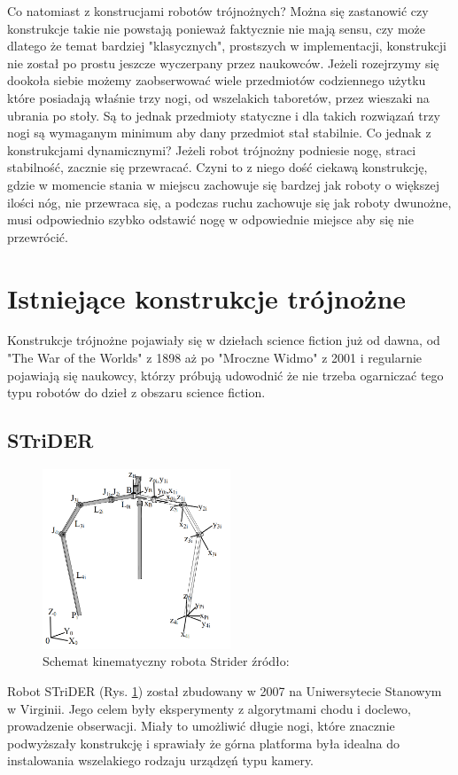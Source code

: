 Co natomiast z konstrucjami robotów trójnożnych? Można się zastanowić czy konstrukcje takie nie powstają ponieważ faktycznie nie mają sensu, czy może dlatego że temat bardziej "klasycznych", prostszych w implementacji, konstrukcji nie został po prostu jeszcze wyczerpany przez naukowców. Jeżeli rozejrzymy się dookoła siebie możemy zaobserwować wiele przedmiotów codziennego użytku które posiadają właśnie trzy nogi, od wszelakich taboretów, przez wieszaki na ubrania po stoły. Są to jednak przedmioty statyczne i dla takich rozwiązań trzy nogi są wymaganym minimum aby dany przedmiot stał stabilnie. Co jednak z konstrukcjami dynamicznymi? Jeżeli robot trójnożny podniesie nogę, straci stabilność, zacznie się przewracać. Czyni to z niego dość ciekawą konstrukcję, gdzie w momencie stania w miejscu zachowuje się bardzej jak roboty o większej ilości nóg, nie przewraca się, a podczas ruchu zachowuje się jak roboty dwunożne, musi odpowiednio szybko odstawić nogę w odpowiednie miejsce aby się nie przewrócić.\\

\section{Istniejące konstrukcje trójnożne}
Konstrukcje trójnożne pojawiały się w dziełach science fiction już od dawna, od "The War of the Worlds" z 1898 aż po "Mroczne Widmo" z 2001 i regularnie pojawiają się naukowcy, którzy próbują udowodnić że nie trzeba ogarniczać tego typu robotów do dzieł z obszaru science fiction.\\
\subsection{STriDER}
\label{cha:strider}
\begin{figure}[h!]
\centering
\includegraphics[width=0.5\textwidth]{img/strider_photo.png}
\caption{Schemat kinematyczny robota Strider źródło: \cite{strider}}
\label{img:strider_photo}
\end{figure}
Robot STriDER (Rys. \ref{img:strider_photo}) został zbudowany w 2007 na Uniwersytecie Stanowym w Virginii. Jego celem były eksperymenty z algorytmami chodu i doclewo, prowadzenie obserwacji. Miały to umożliwić długie nogi, które znacznie podwyższały konstrukcję i sprawiały że górna platforma była idealna do instalowania wszelakiego rodzaju urządzęń typu kamery.\\

